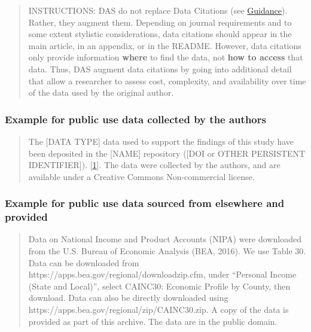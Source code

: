 \documentclass[
]{article}
\begin{document}
\begin{quote}
INSTRUCTIONS: DAS do not replace Data Citations (see
\href{Data_citation_guidance.md}{Guidance}). Rather, they augment them.
Depending on journal requirements and to some extent stylistic
considerations, data citations should appear in the main article, in an
appendix, or in the README. However, data citations only provide
information \textbf{where} to find the data, not \textbf{how to access}
that data. Thus, DAS augment data citations by going into additional
detail that allow a researcher to assess cost, complexity, and
availability over time of the data used by the original author.
\end{quote}

\hypertarget{example-for-public-use-data-collected-by-the-authors}{%
\subsubsection{Example for public use data collected by the
authors}\label{example-for-public-use-data-collected-by-the-authors}}

\begin{quote}
The {[}DATA TYPE{]} data used to support the findings of this study have
been deposited in the {[}NAME{]} repository ({[}DOI or OTHER PERSISTENT
IDENTIFIER{]}).
{[}\href{https://www.hindawi.com/research.data/\#statement.templates}{1}{]}.
The data were collected by the authors, and are available under a
Creative Commons Non-commercial license.
\end{quote}

\hypertarget{example-for-public-use-data-sourced-from-elsewhere-and-provided}{%
\subsubsection{Example for public use data sourced from elsewhere and
provided}\label{example-for-public-use-data-sourced-from-elsewhere-and-provided}}

\begin{quote}
Data on National Income and Product Accounts (NIPA) were downloaded from
the U.S. Bureau of Economic Analysis (BEA, 2016). We use Table 30. Data
can be downloaded from https://apps.bea.gov/regional/downloadzip.cfm,
under ``Personal Income (State and Local)'', select CAINC30: Economic
Profile by County, then download. Data can also be directly downloaded
using https://apps.bea.gov/regional/zip/CAINC30.zip. A copy of the data
is provided as part of this archive. The data are in the public domain.
\end{quote}
\end{document}
